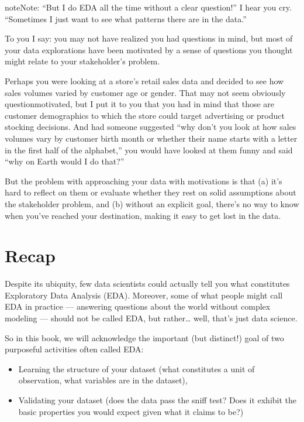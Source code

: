 \documentclass[letterpaper,10pt,english]{jupyterBook}
\begin{document}
\begin{sphinxadmonition}{note}{Note:}
\sphinxAtStartPar
“But I do EDA all the time without a clear question!” I hear you cry. “Sometimes I just want to see what patterns there are in the data.”

\sphinxAtStartPar
To you I say: you may not have realized you had questions in mind, but most of your data explorations have been  motivated by a sense of questions you thought might relate to your stakeholder’s problem.

\sphinxAtStartPar
Perhaps you were looking at a store’s retail sales data and decided to see how sales volumes varied by customer age or gender. That may not seem obviously question\sphinxhyphen{}motivated, but I put it to you that you had in mind that those are customer demographics to which the store could target advertising or product stocking decisions. And had someone suggested “why don’t you look at how sales volumes vary by customer birth month or whether their name starts with a letter in the first half of the alphabet,” you would have looked at them funny and said “why on Earth would I do that?”

\sphinxAtStartPar
But the problem with approaching your data with  motivations is that (a) it’s hard to reflect on them or evaluate whether they rest on solid assumptions about the stakeholder problem, and (b) without an explicit goal, there’s no way to know when you’ve reached your destination, making it   easy to get lost in the data.
\end{sphinxadmonition}


\section{Recap}
\label{\detokenize{30_questions/07_eda:recap}}
\sphinxAtStartPar
Despite its ubiquity, few data scientists could actually tell you what constitutes Exploratory Data Analysis (EDA). Moreover, some of what people might call EDA in practice — answering questions about the world without complex modeling — should not be called EDA, but rather… well, that’s just data science.

\sphinxAtStartPar
So in this book, we will acknowledge the important (but distinct!) goal of two purposeful activities often called EDA:
\begin{itemize}
\item {} 
\sphinxAtStartPar
Learning the structure of your dataset (what constitutes a unit of observation, what variables are in the dataset),

\item {} 
\sphinxAtStartPar
Validating your dataset (does the data pass the sniff test? Does it exhibit the basic properties you would expect given what it claims to be?)

\end{itemize}
\end{document}
